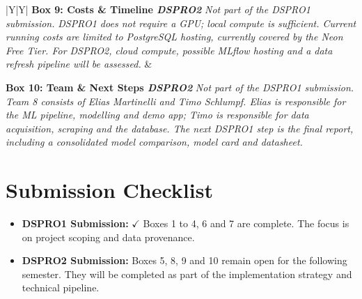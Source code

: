 \documentclass[11pt, a4paper]{article}
\begin{document}
{\begin{xltabular}{\textwidth}{|Y|Y|}
    \textbf{\color{outscope}Box 9: Costs \& Timeline \emph{DSPRO2}} \newline
    \textcolor{outscope}{\emph{Not part of the DSPRO1 submission.}}
    \newline\newline
    \textcolor{outscope}{\emph{DSPRO1 does not require a GPU; local compute is sufficient. Current running costs are limited to PostgreSQL hosting, currently covered by the Neon Free Tier. For DSPRO2, cloud compute, possible MLflow hosting and a data refresh pipeline will be assessed.}}
    &

    \textbf{\color{outscope}Box 10: Team \& Next Steps \emph{DSPRO2}} \newline
    \textcolor{outscope}{\emph{Not part of the DSPRO1 submission.}}
    \newline\newline
    \textcolor{outscope}{\emph{Team 8 consists of Elias Martinelli and Timo Schlumpf. Elias is responsible for the ML pipeline, modelling and demo app; Timo is responsible for data acquisition, scraping and the database. The next DSPRO1 step is the final report, including a consolidated model comparison, model card and datasheet.}}
    \\ \hline

\end{xltabular}
}

\vspace{0.15cm}
\section*{Submission Checklist}
\begin{itemize}
    \item \textbf{DSPRO1 Submission:} \textcolor{green!50!black}{$\checkmark$} Boxes 1 to 4, 6 and 7 are complete. The focus is on project scoping and data provenance.
    \item \textbf{DSPRO2 Submission:} Boxes 5, 8, 9 and 10 remain open for the following semester. They will be completed as part of the implementation strategy and technical pipeline.
\end{itemize}
\end{document}

